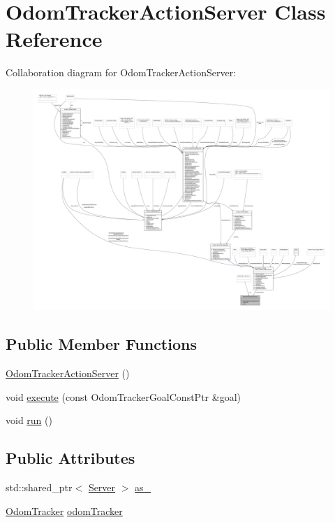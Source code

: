 \hypertarget{classOdomTrackerActionServer}{}\section{Odom\+Tracker\+Action\+Server Class Reference}
\label{classOdomTrackerActionServer}


Collaboration diagram for Odom\+Tracker\+Action\+Server\+:
\nopagebreak
\begin{figure}[H]
\begin{center}
\leavevmode
\includegraphics[width=350pt]{classOdomTrackerActionServer__coll__graph}
\end{center}
\end{figure}
\subsection*{Public Member Functions}
\begin{DoxyCompactItemize}
\item 
\hyperlink{classOdomTrackerActionServer_a98b7fba6da04e1afcf1000f937be7fef}{Odom\+Tracker\+Action\+Server} ()
\item 
void \hyperlink{classOdomTrackerActionServer_afa69287377bb2a12c5346cbe8d68cb04}{execute} (const Odom\+Tracker\+Goal\+Const\+Ptr \&goal)
\item 
void \hyperlink{classOdomTrackerActionServer_a8ab6984c7383949a048d72437e9f79d3}{run} ()
\end{DoxyCompactItemize}
\subsection*{Public Attributes}
\begin{DoxyCompactItemize}
\item 
std\+::shared\+\_\+ptr$<$ \hyperlink{odom__tracker__node_8cpp_a9884574d0480319430f628f79afc0500}{Server} $>$ \hyperlink{classOdomTrackerActionServer_a28bed1d95003d837b2b47053dbc66878}{as\+\_\+}
\item 
\hyperlink{classmove__base__z__client_1_1odom__tracker_1_1OdomTracker}{Odom\+Tracker} \hyperlink{classOdomTrackerActionServer_a3e5c4328d3206fbd2fd2708f0aefe651}{odom\+Tracker}
\end{DoxyCompactItemize}


